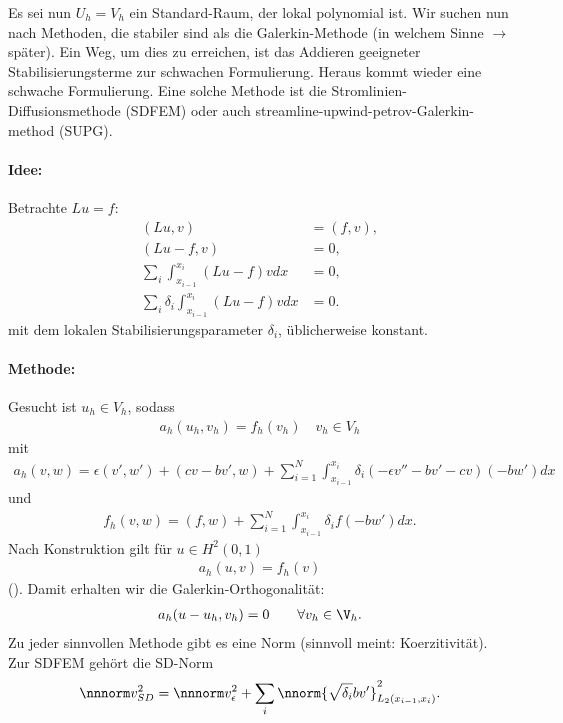 Es sei nun $U_{h} = V_{h}$ ein Standard-Raum, der lokal polynomial ist. Wir suchen nun nach Methoden, die stabiler sind als die Galerkin-Methode (in welchem Sinne $\to$ später). Ein Weg, um dies zu erreichen, ist das Addieren geeigneter Stabilisierungsterme zur schwachen Formulierung. Heraus kommt wieder eine schwache Formulierung. Eine solche Methode ist die Stromlinien-Diffusionsmethode (SDFEM) oder auch streamline-upwind-petrov-Galerkin-method (SUPG). 

\paragraph{Idee:} Betrachte $Lu = f$:
\begin{align*}
  (Lu , v) &= (f, v), \\
  (Lu - f, v) &= 0, \\
  \sum_{i} \int_{x_{i-1}}^{x_{i}} (Lu - f)v dx &= 0,\\
  \sum_{i} \delta_{i} \int_{x_{i-1}}^{x_{i}} (Lu - f)v dx &= 0. 
\end{align*}
mit dem lokalen Stabilisierungsparameter $\delta_{i}$, üblicherweise konstant. 

\paragraph{Methode:}
Gesucht ist $u_{h} \in V_{h}$, sodass
\begin{align*}
  a_{h}(u_{h}, v_{h}) = f_{h}(v_{h}) \quad v_{h} \in V_{h}
\end{align*}
mit
\begin{align*}
  a_{h}(v, w) = \epsilon(v', w') + (c v - bv', w) + \sum_{i= 1}^{N} \int_{x_{i-1}}^{x_{i}} \delta_{i}(- \epsilon v'' - bv' - cv)(- bw') dx
\end{align*}
und
\begin{align*}
  f_{h}(v, w) = (f, w) + \sum_{i= 1}^{N} \int_{x_{i-1}}^{x_{i}} \delta_{i} f (- bw') dx. 
\end{align*}
Nach Konstruktion gilt für $u \in H^{2}(0, 1)$
\begin{align*}  
  a_{h}(u, v) = f_{h}( v)
\end{align*}
(). Damit erhalten wir die Galerkin-Orthogonalität:
\begin{align*}
  a_{h}(u- u_{h}, v_{h}) = 0 \qquad \forall v_{h}\in \V_{h}. 
\end{align*}
Zu jeder sinnvollen Methode gibt es eine Norm (sinnvoll meint: Koerzitivität). Zur SDFEM gehört die SD-Norm
\begin{align*}
  \nnnorm v_{SD}^{2} = \nnnorm v _{\epsilon}^{2} + \sum_{i} \nnorm{\sqrt{\delta_{i}} b v'}_{L_{2}(x_{i-1}, x_{i})}^{2}. 
\end{align*}

